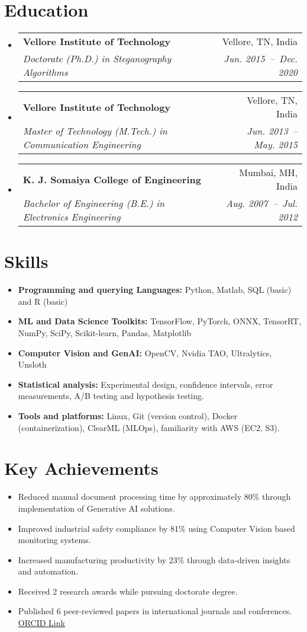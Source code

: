 \documentclass[a4paper,11pt]{article}
\makeatletter
\newcommand{\resumeSubheading}[4]{
  \vspace{-1pt}\item
    \begin{tabular*}{0.97\textwidth}[t]{l@{\extracolsep{\fill}}r}
      \textbf{#1} & #2 \\
      \textit{\small#3} & \textit{\small #4} \\
    \end{tabular*}\vspace{-5pt}
}
\newcommand{\resumeSubHeadingListStart}{\begin{itemize}[leftmargin=*]}
\newcommand{\resumeSubHeadingListEnd}{\end{itemize}}
\makeatother
\begin{document}
\section{Education}
  \resumeSubHeadingListStart
    \resumeSubheading
      {Vellore Institute of Technology}{Vellore, TN, India}
      {Doctorate (Ph.D.) in Steganography Algorithms}{Jun. 2015~--~Dec. 2020}
    \resumeSubheading
      {Vellore Institute of Technology}{Vellore, TN, India}
      {Master of Technology (M.Tech.) in Communication Engineering}{Jun. 2013~--~May. 2015}
    \resumeSubheading
      {K. J. Somaiya College of Engineering}{Mumbai, MH, India}
      {Bachelor of Engineering (B.E.) in Electronics Engineering}{Aug. 2007~--~Jul. 2012}
  \resumeSubHeadingListEnd

\section{Skills}
	\begin{itemize}[leftmargin=*, itemsep = -2pt]
    \item{\textbf{Programming and querying Languages:} Python, Matlab, SQL (basic) and R (basic)}
		\item{\textbf{ML and Data Science Toolkits:} TensorFlow, PyTorch, ONNX, TensorRT, NumPy, SciPy, Scikit-learn, Pandas, Matplotlib}
		\item{\textbf{Computer Vision and GenAI:} OpenCV, Nvidia TAO, Ultralytics, Unsloth}
		\item{\textbf{Statistical analysis:} Experimental design, confidence intervals, error measurements, A/B testing and hypothesis testing.}
    \item{\textbf{Tools and platforms:} Linux, Git (version control), Docker (containerization), ClearML (MLOps), familiarity with AWS (EC2, S3).}
	\end{itemize}

\section{Key Achievements}
  \begin{itemize}[leftmargin=*, itemsep = -4pt]
    \item{Reduced manual document processing time by approximately 80\% through implementation of Generative AI solutions.}
    \item{Improved industrial safety compliance by 81\% using Computer Vision based monitoring systems.}
    \item{Increased manufacturing productivity by 23\% through data-driven insights and automation.}
    \item{Received 2 research awards while pursuing doctorate degree.}
    \item{Published 6 peer-reviewed papers in international journals and conferences. \href{https://orcid.org/0000-0002-2247-9046}{ORCID Link}}
  \end{itemize}
\end{document}
